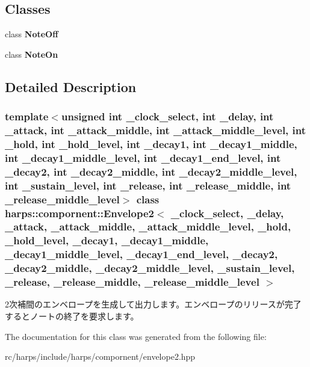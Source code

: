 \subsection*{Classes}
\begin{CompactItemize}
\item 
class \textbf{NoteOff}
\item 
class \textbf{NoteOn}
\end{CompactItemize}


\subsection{Detailed Description}
\subsubsection*{template$<$unsigned int \_\-clock\_\-select, int \_\-delay, int \_\-attack, int \_\-attack\_\-middle, int \_\-attack\_\-middle\_\-level, int \_\-hold, int \_\-hold\_\-level, int \_\-decay1, int \_\-decay1\_\-middle, int \_\-decay1\_\-middle\_\-level, int \_\-decay1\_\-end\_\-level, int \_\-decay2, int \_\-decay2\_\-middle, int \_\-decay2\_\-middle\_\-level, int \_\-sustain\_\-level, int \_\-release, int \_\-release\_\-middle, int \_\-release\_\-middle\_\-level$>$ class harps::compornent::Envelope2$<$ \_\-clock\_\-select, \_\-delay, \_\-attack, \_\-attack\_\-middle, \_\-attack\_\-middle\_\-level, \_\-hold, \_\-hold\_\-level, \_\-decay1, \_\-decay1\_\-middle, \_\-decay1\_\-middle\_\-level, \_\-decay1\_\-end\_\-level, \_\-decay2, \_\-decay2\_\-middle, \_\-decay2\_\-middle\_\-level, \_\-sustain\_\-level, \_\-release, \_\-release\_\-middle, \_\-release\_\-middle\_\-level $>$}

2次補間のエンベロープを生成して出力します。エンベロープのリリースが完了するとノートの終了を要求します。 

The documentation for this class was generated from the following file:\begin{CompactItemize}
\item 
rc/harps/include/harps/compornent/envelope2.hpp\end{CompactItemize}
